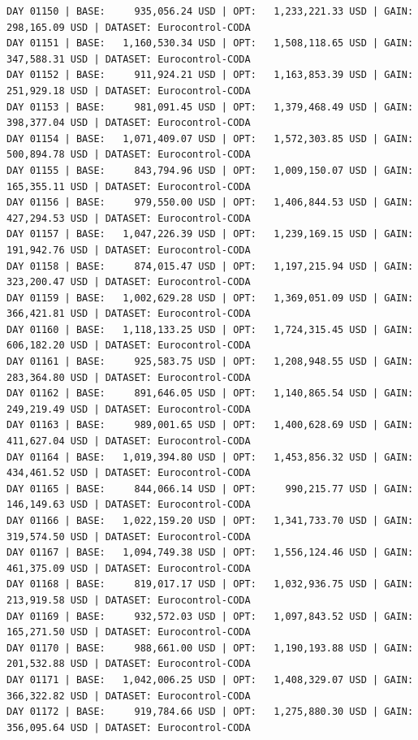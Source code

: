 \documentclass[11pt,a4paper]{article}
\begin{document}
\begin{verbatim}
DAY 01150 | BASE:     935,056.24 USD | OPT:   1,233,221.33 USD | GAIN: 298,165.09 USD | DATASET: Eurocontrol-CODA
DAY 01151 | BASE:   1,160,530.34 USD | OPT:   1,508,118.65 USD | GAIN: 347,588.31 USD | DATASET: Eurocontrol-CODA
DAY 01152 | BASE:     911,924.21 USD | OPT:   1,163,853.39 USD | GAIN: 251,929.18 USD | DATASET: Eurocontrol-CODA
DAY 01153 | BASE:     981,091.45 USD | OPT:   1,379,468.49 USD | GAIN: 398,377.04 USD | DATASET: Eurocontrol-CODA
DAY 01154 | BASE:   1,071,409.07 USD | OPT:   1,572,303.85 USD | GAIN: 500,894.78 USD | DATASET: Eurocontrol-CODA
DAY 01155 | BASE:     843,794.96 USD | OPT:   1,009,150.07 USD | GAIN: 165,355.11 USD | DATASET: Eurocontrol-CODA
DAY 01156 | BASE:     979,550.00 USD | OPT:   1,406,844.53 USD | GAIN: 427,294.53 USD | DATASET: Eurocontrol-CODA
DAY 01157 | BASE:   1,047,226.39 USD | OPT:   1,239,169.15 USD | GAIN: 191,942.76 USD | DATASET: Eurocontrol-CODA
DAY 01158 | BASE:     874,015.47 USD | OPT:   1,197,215.94 USD | GAIN: 323,200.47 USD | DATASET: Eurocontrol-CODA
DAY 01159 | BASE:   1,002,629.28 USD | OPT:   1,369,051.09 USD | GAIN: 366,421.81 USD | DATASET: Eurocontrol-CODA
DAY 01160 | BASE:   1,118,133.25 USD | OPT:   1,724,315.45 USD | GAIN: 606,182.20 USD | DATASET: Eurocontrol-CODA
DAY 01161 | BASE:     925,583.75 USD | OPT:   1,208,948.55 USD | GAIN: 283,364.80 USD | DATASET: Eurocontrol-CODA
DAY 01162 | BASE:     891,646.05 USD | OPT:   1,140,865.54 USD | GAIN: 249,219.49 USD | DATASET: Eurocontrol-CODA
DAY 01163 | BASE:     989,001.65 USD | OPT:   1,400,628.69 USD | GAIN: 411,627.04 USD | DATASET: Eurocontrol-CODA
DAY 01164 | BASE:   1,019,394.80 USD | OPT:   1,453,856.32 USD | GAIN: 434,461.52 USD | DATASET: Eurocontrol-CODA
DAY 01165 | BASE:     844,066.14 USD | OPT:     990,215.77 USD | GAIN: 146,149.63 USD | DATASET: Eurocontrol-CODA
DAY 01166 | BASE:   1,022,159.20 USD | OPT:   1,341,733.70 USD | GAIN: 319,574.50 USD | DATASET: Eurocontrol-CODA
DAY 01167 | BASE:   1,094,749.38 USD | OPT:   1,556,124.46 USD | GAIN: 461,375.09 USD | DATASET: Eurocontrol-CODA
DAY 01168 | BASE:     819,017.17 USD | OPT:   1,032,936.75 USD | GAIN: 213,919.58 USD | DATASET: Eurocontrol-CODA
DAY 01169 | BASE:     932,572.03 USD | OPT:   1,097,843.52 USD | GAIN: 165,271.50 USD | DATASET: Eurocontrol-CODA
DAY 01170 | BASE:     988,661.00 USD | OPT:   1,190,193.88 USD | GAIN: 201,532.88 USD | DATASET: Eurocontrol-CODA
DAY 01171 | BASE:   1,042,006.25 USD | OPT:   1,408,329.07 USD | GAIN: 366,322.82 USD | DATASET: Eurocontrol-CODA
DAY 01172 | BASE:     919,784.66 USD | OPT:   1,275,880.30 USD | GAIN: 356,095.64 USD | DATASET: Eurocontrol-CODA

\end{verbatim}
\end{document}
